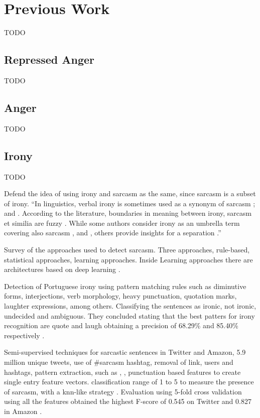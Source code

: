 
\section{Previous Work}
\label{sec:previous_work}

TODO

\subsection{Repressed Anger}
\label{subsec:repressed_anger}

TODO

\subsection{Anger}
\label{subsec:anger}

TODO

\subsection{Irony}
\label{subsec:irony}

TODO

Defend the idea of using irony and sarcasm as the same, since sarcasm is a subset of irony.
``In linguistics, verbal irony is sometimes used as a synonym of sarcasm \cite{giora2013negation}; \cite{giora2015defaultness} and \cite{giora2015default}. According to the literature, boundaries in meaning between irony, sarcasm et similia are fuzzy \cite{bosco2013developing}. While some authors consider irony as an umbrella term covering also sarcasm \cite{gibbs1991psychological}, \cite{wilson2006pragmatics} and \cite{kreuz1993empirical}, others provide insights for a separation \cite{filatova2012irony}.''


Survey of the approaches used to detect sarcasm. Three approaches, rule-based, statistical approaches, learning approaches. Inside Learning approaches there are architectures based on deep learning \cite{joshi2016automatic}.

Detection of Portuguese irony using pattern matching rules such as diminutive forms, interjections, verb morphology, heavy punctuation, quotation marks, laughter expressions, among others. Classifying the sentences as ironic, not ironic, undecided and ambiguous. They concluded stating that the best patters for irony recognition are quote and laugh obtaining a precision of 68.29\% and 85.40\% respectively \cite{carvalho2009clues}.

Semi-supervised techniques for sarcastic sentences in Twitter and Amazon, 5.9 million unique tweets, use of \#sarcasm hashtag, removal of link, users and hashtags, pattern extraction, such as , , punctuation based features to create single entry feature vectors. classification range of 1 to 5 to measure the presence of sarcasm, with a \acrfull{knn}-like strategy \cite{davidov2010enhanced}. Evaluation using 5-fold cross validation using all the features obtained the highest F-score of 0.545 on Twitter and 0.827 in Amazon \cite{davidov2010semi}.